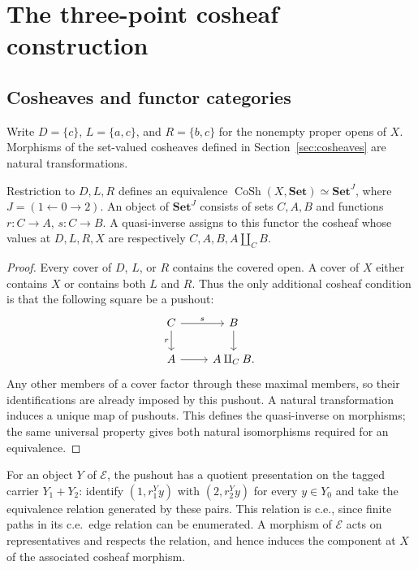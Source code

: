 \section{The three-point cosheaf construction}\label{app:fork-structure}

\subsection{Cosheaves and functor categories}

Write $D=\{c\}$, $L=\{a,c\}$, and $R=\{b,c\}$ for the nonempty
proper opens of $X$. Morphisms of the set-valued cosheaves defined in
Section~\ref{sec:cosheaves} are natural transformations.

\begin{proposition}\label{prop:fork-cosheaves}
Restriction to $D,L,R$ defines an equivalence
$\operatorname{CoSh}(X,\mathbf{Set})\simeq\mathbf{Set}^{J}$,
where $J=(1\leftarrow0\to2)$. An object of $\mathbf{Set}^{J}$
consists of sets $C,A,B$ and functions $r:C\to A$, $s:C\to B$.
A quasi-inverse assigns to this functor the cosheaf whose values at
$D,L,R,X$ are respectively $C,A,B,A\amalg_C B$.
\end{proposition}
\begin{proof}
Every cover of $D$, $L$, or $R$ contains the covered open. A cover
of $X$ either contains $X$ or contains both $L$ and $R$. Thus the
only additional cosheaf condition is that the following square be
a pushout:
\[
\begin{tikzcd}
C\arrow[r,"s"]\arrow[d,"r"']&B\arrow[d]\\
A\arrow[r]&A\amalg_C B.
\end{tikzcd}
\]
Any other members of a cover factor through these maximal members,
so their identifications are already imposed by this pushout.
A natural transformation induces a unique map of pushouts.
This defines the quasi-inverse on morphisms; the same universal
property gives both natural isomorphisms required for an equivalence.
\end{proof}

For an object $Y$ of $\mathcal E$, the pushout has a
quotient presentation on the tagged carrier $Y_1+Y_2$: identify
$(1,r_1^Yy)$ with $(2,r_2^Yy)$ for every $y\in Y_0$ and take the
equivalence relation generated by these pairs. This relation is c.e.,
since finite paths in its c.e.\ edge relation can be enumerated.
A morphism of $\mathcal E$ acts on representatives and respects the
relation, and hence induces the component at $X$ of the associated
cosheaf morphism.

